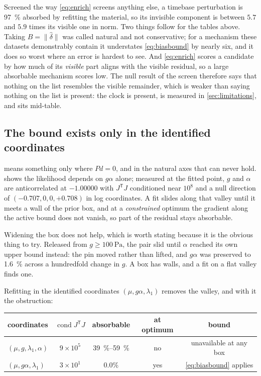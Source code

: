 \documentclass[10pt]{article}
\begin{document}
Screened the way \eqref{eq:enrich} screens anything else, a timebase perturbation is
\SI{97}{\percent} absorbed by refitting the material, so its invisible component is between
$5.7$ and $5.9$ times its visible one in norm. Two things follow for the tables above. Taking
$B = \lVert\hat\delta\rVert$ was called natural and not conservative; for a mechanism these
datasets demonstrably contain it understates \eqref{eq:biasbound} by nearly six, and it does so
worst where an error is hardest to see. And \eqref{eq:enrich} scores a candidate by how much of
its \emph{visible} part aligns with the visible residual, so a large absorbable mechanism scores
low. The null result of the screen therefore says that nothing on the list resembles the visible
remainder, which is weaker than saying nothing on the list is present: the clock is present, is
measured in \cref{sec:limitations}, and sits mid-table.

\subsection*{The bound exists only in the identified coordinates}

 means something only where $Pd = 0$, and in the natural axes that can
never hold.  shows the likelihood depends on $g\alpha$ alone;
measured at the fitted point, $g$ and $\alpha$ are anticorrelated at $-1.00000$ with
$J^{\mathsf T}J$ conditioned near $10^{8}$ and a null direction of $(-0.707,0,0,+0.708)$ in log
coordinates. A fit slides along that valley until it meets a wall of the prior box, and at a
\emph{constrained} optimum the gradient along the active bound does not vanish, so part of the
residual stays absorbable.

Widening the box does not help, which is worth stating because it is the obvious thing to try.
Released from $g \ge \SI{100}{\pascal}$, the pair slid until $\alpha$ reached its own upper
bound instead: the pin moved rather than lifted, and $g\alpha$ was preserved to
\SI{1.6}{\percent} across a hundredfold change in $g$. A box has walls, and a fit on a flat
valley finds one.

Refitting in the identified coordinates $(\mu, g\alpha, \lambda_1)$ removes the valley, and
with it the obstruction:

\begin{center}
\begin{tabular}{lcccc}
\toprule
coordinates & $\operatorname{cond} J^{\mathsf T}J$ & absorbable & at optimum & bound \\
\midrule
$(\mu, g, \lambda_1, \alpha)$ & $9\times10^{5}$ & \SIrange{39}{59}{\percent} & no & unavailable at any box \\
$(\mu, g\alpha, \lambda_1)$ & $3\times10^{1}$ & $0.0\%$ & yes & \eqref{eq:biasbound} applies \\
\bottomrule
\end{tabular}
\end{center}
\end{document}
